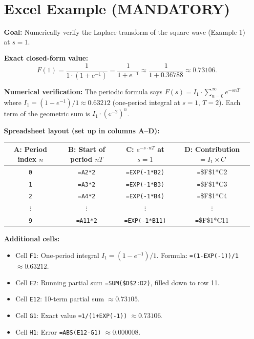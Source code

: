 \documentclass[12pt,a4paper]{article}
\begin{document}
\section{Excel Example (MANDATORY)}

\textbf{Goal:} Numerically verify the Laplace transform of the square wave
(Example 1) at $s = 1$.

\textbf{Exact closed-form value:}
\[
  F(1) = \frac{1}{1 \cdot (1 + e^{-1})} = \frac{1}{1 + e^{-1}}
  \approx \frac{1}{1 + 0.36788} \approx 0.73106.
\]

\textbf{Numerical verification:} The periodic formula says
$F(s) = I_1 \cdot \sum_{n=0}^{\infty} e^{-snT}$ where $I_1 = (1-e^{-1})/1
\approx 0.63212$ (one-period integral at $s=1$, $T=2$). Each term of the
geometric sum is $I_1 \cdot (e^{-2})^n$.

\medskip
\noindent\textbf{Spreadsheet layout (set up in columns A--D):}

\begin{center}
\begin{tabular}{@{}cccc@{}}
\toprule
\textbf{A: Period index $n$} &
\textbf{B: Start of period $nT$} &
\textbf{C: $e^{-s \cdot nT}$ at $s=1$} &
\textbf{D: Contribution $= I_1 \times C$} \\
\midrule
\texttt{0} & \texttt{=A2*2} & \texttt{=EXP(-1*B2)} & \texttt=\$F\$1*C2 \\
\texttt{1} & \texttt{=A3*2} & \texttt{=EXP(-1*B3)} & \texttt=\$F\$1*C3 \\
\texttt{2} & \texttt{=A4*2} & \texttt{=EXP(-1*B4)} & \texttt=\$F\$1*C4 \\
$\vdots$ & $\vdots$ & $\vdots$ & $\vdots$ \\
\texttt{9} & \texttt{=A11*2} & \texttt{=EXP(-1*B11)} & \texttt=\$F\$1*C11 \\
\bottomrule
\end{tabular}
\end{center}

\medskip
\noindent\textbf{Additional cells:}
\begin{itemize}[noitemsep]
  \item Cell \texttt{F1}: One-period integral $I_1 = (1 - e^{-1})/1$.
        Formula: \texttt{=(1-EXP(-1))/1} $\approx 0.63212$.
  \item Cell \texttt{E2}: Running partial sum \texttt{=SUM(\$D\$2:D2)}, filled
        down to row 11.
  \item Cell \texttt{E12}: 10-term partial sum $\approx 0.73105$.
  \item Cell \texttt{G1}: Exact value \texttt{=1/(1+EXP(-1))} $\approx 0.73106$.
  \item Cell \texttt{H1}: Error \texttt{=ABS(E12-G1)} $\approx 0.000008$.
\end{itemize}
\end{document}
